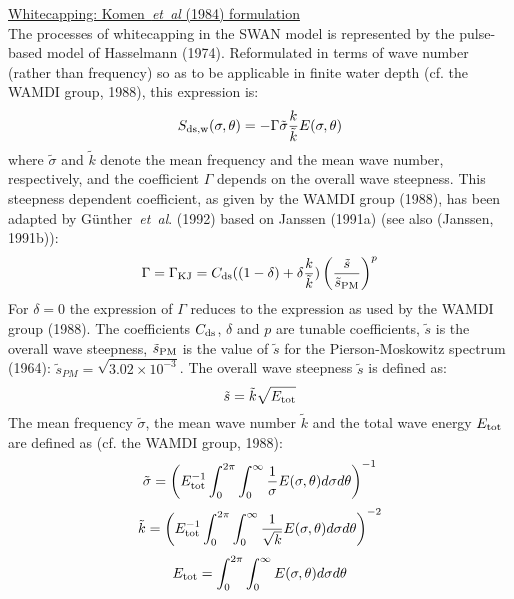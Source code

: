 \documentclass[12pt]{book}
\begin{document}
\noindent
\underline{Whitecapping: Komen~{\it et~al} (1984) formulation}\\[2ex]
The processes of whitecapping in the SWAN model is represented by the pulse-based model of
Hasselmann (1974). Reformulated in terms of wave number (rather than frequency) so as to be
applicable in finite water depth (cf. the WAMDI group, 1988), this expression is:
\begin{equation}
  S_{\rm ds,w} (\sigma,\theta) = -\Gamma \tilde{\sigma} \frac{k}{\tilde{k}} E (\sigma,\theta)
  \label{eq3-11}
\end{equation}
where ${\tilde{\sigma}}$ and ${\tilde{k}}$ denote the mean frequency and the mean wave number,
respectively, and the coefficient $\Gamma$ depends on the overall wave steepness. This steepness dependent
coefficient, as given by the WAMDI group (1988), has been adapted by G\"{u}nther~{\it et~al}. (1992) based on
Janssen (1991a) (see also (Janssen, 1991b)):
\begin{equation}
   \Gamma = \Gamma_{\rm KJ} = C_{\rm ds} ((1-\delta) + \delta \frac{k}{\tilde{k}})
   \left(\frac{\tilde{s}}{\tilde{s}_{\rm PM}} \right)^p
  \label{eq3-12}
\end{equation}
For $\delta=0$ the expression of $\Gamma$ reduces to the expression as used by the WAMDI group (1988). The
coefficients $C_{\rm ds}$, $\delta$ and $p$ are tunable coefficients, ${\tilde{s}}$ is the overall wave
steepness, ${\tilde{s}}_{\rm PM}$ is the value of ${\tilde{s}}$ for the Pierson-Moskowitz
spectrum (1964): ${\tilde{s}}_{PM} = \sqrt{3.02 \times 10^{-3}}$. The overall wave steepness ${\tilde{s}}$
is defined as:
\begin{equation}
  \tilde{s} = \tilde{k} \sqrt{E_{\rm tot}}
  \label{eq3-13}
\end{equation}
The mean frequency ${\tilde{\sigma}}$, the mean wave number ${\tilde{k}}$ and the total wave energy
$E_{\rm tot}$ are defined as (cf. the WAMDI group, 1988):
\begin{equation}
  \tilde{\sigma} = \left( E^{-1}_{\rm tot} \int_{0}^{2\pi} \int_{0}^{\infty} \frac{1}{\sigma}E(\sigma,\theta) d\sigma d\theta \right)^{-1}
  \label{eq3-14}
\end{equation}
\begin{equation}
  \tilde{k} = \left(E^{-1}_{\rm tot} \int_{0}^{2\pi} \int_{0}^{\infty} \frac{1}{\sqrt{k}}E(\sigma,\theta) d\sigma d\theta\right)^{-2}
  \label{eq3-15}
\end{equation}
\begin{equation}
  E_{\rm tot} = \int_{0}^{2\pi} \int_{0}^{\infty} E(\sigma,\theta)d\sigma d\theta
  \label{eq3-16}
\end{equation}
\end{document}
